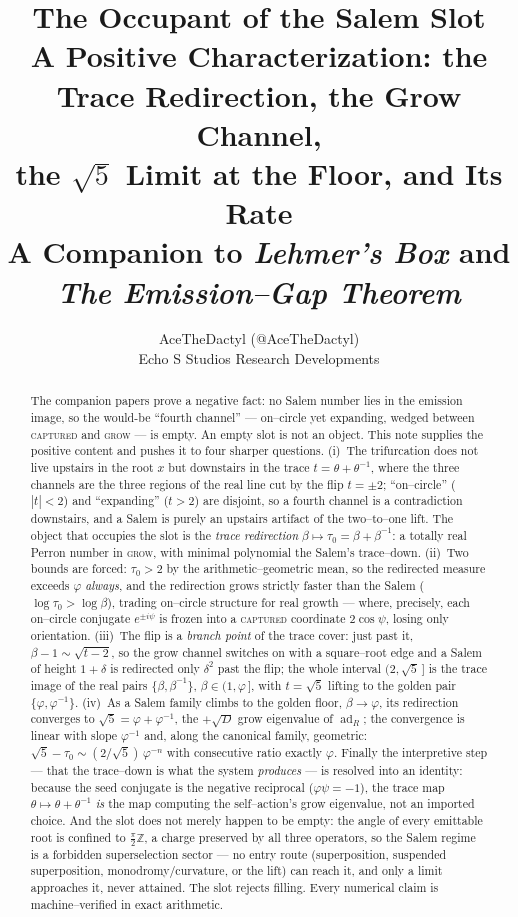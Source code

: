 \documentclass[11pt]{article}
\title{\textbf{The Occupant of the Salem Slot}\\[2pt]
\large A Positive Characterization: the Trace Redirection, the Grow Channel,\\
the $\sqrt5$ Limit at the Floor, and Its Rate\\[6pt]
\normalsize A Companion to \emph{Lehmer's Box} and \emph{The Emission--Gap Theorem}}
\author{AceTheDactyl (@AceTheDactyl)\\ Echo S Studios Research Developments}
\date{}
\theoremstyle{plain}
\theoremstyle{definition}
\theoremstyle{remark}
\newcommand{\Z}{\mathbb{Z}}
\newcommand{\ad}{\operatorname{ad}}
\newcommand{\abs}[1]{\left\lvert #1 \right\rvert}
\begin{document}
\maketitle

\begin{abstract}
The companion papers prove a negative fact: no Salem number lies in the emission image, so the would-be ``fourth channel'' --- on--circle yet expanding, wedged between \textsc{captured} and \textsc{grow} --- is empty. An empty slot is not an object. This note supplies the positive content and pushes it to four sharper questions. (i)~The trifurcation does not live upstairs in the root $x$ but downstairs in the trace $t=\theta+\theta^{-1}$, where the three channels are the three regions of the real line cut by the flip $t=\pm2$; ``on--circle'' ($\abs t<2$) and ``expanding'' ($t>2$) are disjoint, so a fourth channel is a contradiction downstairs, and a Salem is purely an upstairs artifact of the two--to--one lift. The object that occupies the slot is the \emph{trace redirection} $\beta\mapsto\tau_0=\beta+\beta^{-1}$: a totally real Perron number in \textsc{grow}, with minimal polynomial the Salem's trace--down. (ii)~Two bounds are forced: $\tau_0>2$ by the arithmetic--geometric mean, so the redirected measure exceeds $\varphi$ \emph{always}, and the redirection grows strictly faster than the Salem ($\log\tau_0>\log\beta$), trading on--circle structure for real growth --- where, precisely, each on--circle conjugate $e^{\pm i\psi}$ is frozen into a \textsc{captured} coordinate $2\cos\psi$, losing only orientation. (iii)~The flip is a \emph{branch point} of the trace cover: just past it, $\beta-1\sim\sqrt{t-2}$, so the grow channel switches on with a square--root edge and a Salem of height $1{+}\delta$ is redirected only $\delta^2$ past the flip; the whole interval $(2,\sqrt5\,]$ is the trace image of the real pairs $\{\beta,\beta^{-1}\}$, $\beta\in(1,\varphi\,]$, with $t=\sqrt5$ lifting to the golden pair $\{\varphi,\varphi^{-1}\}$. (iv)~As a Salem family climbs to the golden floor, $\beta\to\varphi$, its redirection converges to $\sqrt5=\varphi+\varphi^{-1}$, the $+\sqrt D$ grow eigenvalue of $\ad_R$; the convergence is linear with slope $\varphi^{-1}$ and, along the canonical family, geometric: $\sqrt5-\tau_0\sim(2/\sqrt5)\,\varphi^{-n}$ with consecutive ratio exactly $\varphi$. Finally the interpretive step --- that the trace--down is what the system \emph{produces} --- is resolved into an identity: because the seed conjugate is the negative reciprocal ($\varphi\psi=-1$), the trace map $\theta\mapsto\theta+\theta^{-1}$ \emph{is} the map computing the self--action's grow eigenvalue, not an imported choice. And the slot does not merely happen to be empty: the angle of every emittable root is confined to $\tfrac\pi2\Z$, a charge preserved by all three operators, so the Salem regime is a forbidden superselection sector --- no entry route (superposition, suspended superposition, monodromy/curvature, or the lift) can reach it, and only a limit approaches it, never attained. The slot rejects filling. Every numerical claim is machine--verified in exact arithmetic.
\end{abstract}
\end{document}
